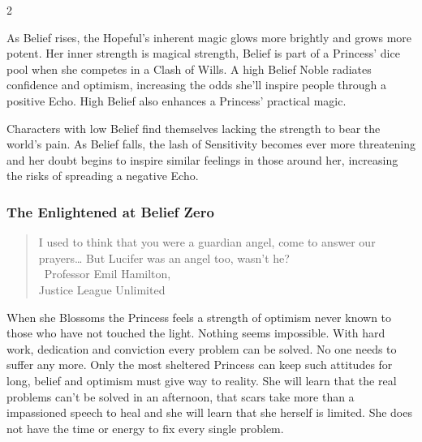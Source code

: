 \begin{multicols}{2}

As Belief rises, the Hopeful's inherent magic glows more brightly and grows more potent. Her inner strength is magical strength, Belief is part of a Princess' dice pool when she competes in a Clash of Wills. A high Belief Noble radiates confidence and optimism, increasing the odds she'll inspire people through a positive Echo. High Belief also enhances a Princess' practical magic.

Characters with low Belief find themselves lacking the strength to bear the world's pain. As Belief falls, the lash of Sensitivity becomes ever more threatening and her doubt begins to inspire similar feelings in those around her, increasing the risks of spreading a negative Echo. 

\subsubsection*{The Enlightened at Belief Zero}

\begin{quote}I used to think that you were a guardian angel, come to answer our prayers… But Lucifer was an angel too, wasn’t he?\\
\textemdash\, Professor Emil Hamilton, \\ Justice League Unlimited \end{quote}

When she Blossoms the Princess feels a strength of optimism never known to those who have not touched the light. Nothing seems impossible. With hard work, dedication and conviction every problem can be solved. No one needs to suffer any more. Only the most sheltered Princess can keep such attitudes for long, belief and optimism must give way to reality. She will learn that the real problems can't be solved in an afternoon, that scars take more than a impassioned speech to heal and she will learn that she herself is limited. She does not have the time or energy to fix every single problem.


\end{multicols}
